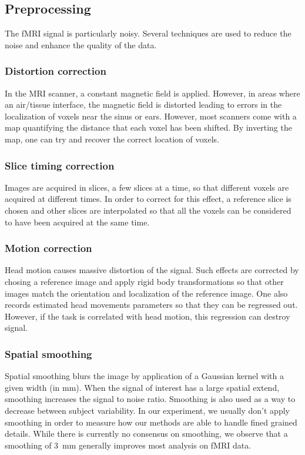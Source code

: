 \subsection{Preprocessing}
The fMRI signal is particularly noisy. Several techniques are used to reduce the noise and enhance the quality of the data.

\subsubsection{Distortion correction}
In the MRI scanner, a constant magnetic field is applied. However, in areas
where an air/tissue interface, the magnetic field is distorted leading to errors in
the localization of voxels near the sinus or ears. However, most scanners come
with a map quantifying the distance that each voxel has been shifted. By
inverting the map, one can try and recover the correct location of voxels.


\subsubsection{Slice timing correction}
Images are acquired in slices, a few slices at a time, so that different voxels are acquired at different times.
In order to correct for this effect, a reference slice is chosen and other slices are interpolated so that all the voxels can be considered to have been acquired at the same time. 

\subsubsection{Motion correction}
Head motion causes massive distortion of the signal. Such effects are corrected by
chosing a reference image and apply rigid body transformations so that other
images match the orientation and localization of the reference image. One also records estimated head movements parameters so that they can be regressed out. However, if the task is correlated with head motion, this regression can destroy signal.

\subsubsection{Spatial smoothing}
Spatial smoothing blurs the image by application of a Gaussian kernel with a given width (in mm). When the signal of interest has a large spatial extend, smoothing increases the signal to noise ratio. 
Smoothing is also used as a way to decrease between subject variability.
In our experiment, we usually don't apply smoothing in order to measure how our
methods are able to handle fined grained details. While there is currently no
consensus on smoothing, we observe that a smoothing of 3~mm generally improves
most analysis on fMRI data.

